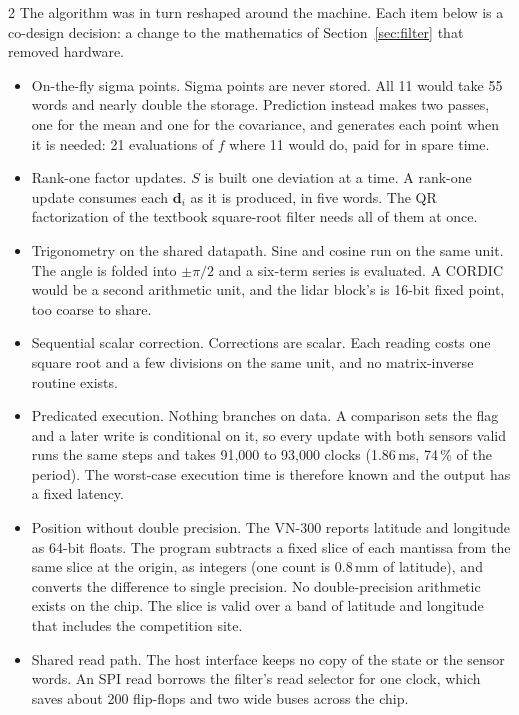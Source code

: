 \documentclass[10pt,letterpaper]{article}
\begin{document}
\begin{multicols}{2}
  The algorithm was in turn reshaped around the machine.
  Each item below is a co-design decision: a change to the mathematics of Section~\ref{sec:filter} that removed hardware.
  \begin{itemize}
    \item On-the-fly sigma points.
      Sigma points are never stored.
      All 11 would take 55 words and nearly double the storage.
      Prediction instead makes two passes, one for the mean and one for the covariance, and generates each point when it is needed: 21 evaluations of $f$ where 11 would do, paid for in spare time.
    \item Rank-one factor updates.
      $S$ is built one deviation at a time.
      A rank-one update consumes each $\mathbf{d}_i$ as it is produced, in five words.
      The QR factorization of the textbook square-root filter needs all of them at once.
    \item Trigonometry on the shared datapath.
      Sine and cosine run on the same unit.
      The angle is folded into $\pm\pi/2$ and a six-term series is evaluated.
      A CORDIC would be a second arithmetic unit, and the lidar block's is 16-bit fixed point, too coarse to share.
    \item Sequential scalar correction.
      Corrections are scalar.
      Each reading costs one square root and a few divisions on the same unit, and no matrix-inverse routine exists.
    \item Predicated execution.
      Nothing branches on data.
      A comparison sets the flag and a later write is conditional on it, so every update with both sensors valid runs the same steps and takes 91,000 to 93,000 clocks (1.86\,ms, 74\,\% of the period).
      The worst-case execution time is therefore known and the output has a fixed latency.
    \item Position without double precision.
      The VN-300 reports latitude and longitude as 64-bit floats.
      The program subtracts a fixed slice of each mantissa from the same slice at the origin, as integers (one count is 0.8\,mm of latitude), and converts the difference to single precision.
      No double-precision arithmetic exists on the chip.
      The slice is valid over a band of latitude and longitude that includes the competition site.
    \item Shared read path.
      The host interface keeps no copy of the state or the sensor words.
      An SPI read borrows the filter's read selector for one clock, which saves about 200 flip-flops and two wide buses across the chip.
  \end{itemize}


\end{multicols}
\end{document}
